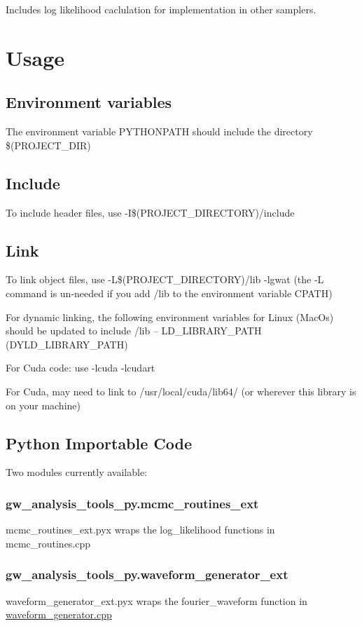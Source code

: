Includes log likelihood caclulation for implementation in other samplers.\hypertarget{index_usage}{}\section{Usage}\label{index_usage}
\hypertarget{index_var}{}\subsection{Environment variables}\label{index_var}
The environment variable P\+Y\+T\+H\+O\+N\+P\+A\+TH should include the directory \$(P\+R\+O\+J\+E\+C\+T\+\_\+\+D\+IR)\hypertarget{index_include}{}\subsection{Include}\label{index_include}
To include header files, use -\/I\$(P\+R\+O\+J\+E\+C\+T\+\_\+\+D\+I\+R\+E\+C\+T\+O\+RY)/include\hypertarget{index_link}{}\subsection{Link}\label{index_link}
To link object files, use -\/L\$(P\+R\+O\+J\+E\+C\+T\+\_\+\+D\+I\+R\+E\+C\+T\+O\+RY)/lib -\/lgwat (the -\/L command is un-\/needed if you add /lib to the environment variable C\+P\+A\+TH)

For dynamic linking, the following environment variables for Linux (Mac\+Os) should be updated to include /lib -- L\+D\+\_\+\+L\+I\+B\+R\+A\+R\+Y\+\_\+\+P\+A\+TH (D\+Y\+L\+D\+\_\+\+L\+I\+B\+R\+A\+R\+Y\+\_\+\+P\+A\+TH)

For Cuda code\+: use -\/lcuda -\/lcudart

For Cuda, may need to link to /usr/local/cuda/lib64/ (or wherever this library is on your machine)\hypertarget{index_py}{}\subsection{Python Importable Code}\label{index_py}
Two modules currently available\+:\hypertarget{index_mcmcpy}{}\subsubsection{gw\+\_\+analysis\+\_\+tools\+\_\+py.\+mcmc\+\_\+routines\+\_\+ext}\label{index_mcmcpy}
mcmc\+\_\+routines\+\_\+ext.\+pyx wraps the log\+\_\+likelihood functions in mcmc\+\_\+routines.\+cpp\hypertarget{index_wavegenpy}{}\subsubsection{gw\+\_\+analysis\+\_\+tools\+\_\+py.\+waveform\+\_\+generator\+\_\+ext}\label{index_wavegenpy}
waveform\+\_\+generator\+\_\+ext.\+pyx wraps the fourier\+\_\+waveform function in \hyperlink{waveform__generator_8cpp}{waveform\+\_\+generator.\+cpp}

